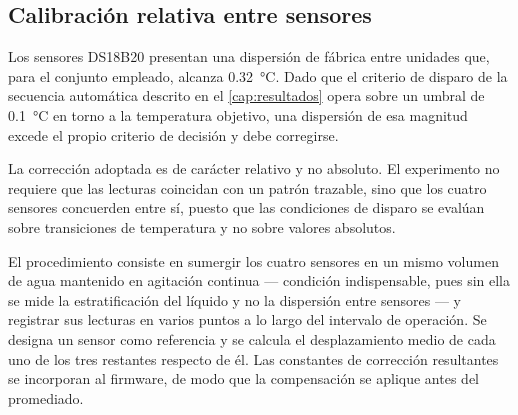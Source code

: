 \subsection*{Calibración relativa entre sensores}

Los sensores DS18B20 presentan una dispersión de fábrica entre
unidades que, para el conjunto empleado, alcanza
\SI{0.32}{\celsius}. Dado que el criterio de disparo de la secuencia
automática descrito en el \cref{cap:resultados} opera sobre un umbral
de \SI{0.1}{\celsius} en torno a la temperatura objetivo, una
dispersión de esa magnitud excede el propio criterio de decisión y
debe corregirse.

La corrección adoptada es de carácter relativo y no absoluto. El
experimento no requiere que las lecturas coincidan con un patrón
trazable, sino que los cuatro sensores concuerden entre sí, puesto que
las condiciones de disparo se evalúan sobre transiciones de
temperatura y no sobre valores absolutos.

El procedimiento consiste en sumergir los cuatro sensores en un mismo
volumen de agua mantenido en agitación continua --- condición
indispensable, pues sin ella se mide la estratificación del líquido y
no la dispersión entre sensores --- y registrar sus lecturas en
varios puntos a lo largo del intervalo de operación. Se designa un
sensor como referencia y se calcula el desplazamiento medio de cada
uno de los tres restantes respecto de él. Las constantes de
corrección resultantes se incorporan al firmware, de modo que la
compensación se aplique antes del promediado.


